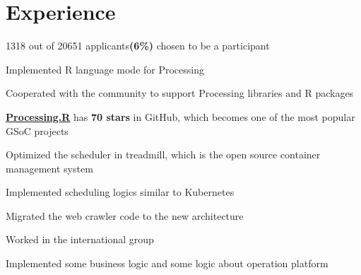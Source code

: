 \documentclass[]{deedy-resume-openfont}
\begin{document}
\begin{minipage}[t]{0.73\textwidth}


\section{Experience}
\sectionsep
{}
\vspace{\topsep}
\begin{tightemize}
    \item 1318 out of 20651 applicants\textbf{(6\%)} chosen to be a participant
    \item Implemented R language mode for Processing
    \item Cooperated with the community to support Processing libraries and R packages
    \item \href{https://github.com/gaocegege/Processing.R}{\bf Processing.R} has \textbf{70 stars} in GitHub, which becomes one of the most popular GSoC projects
\end{tightemize}
\sectionsep

\begin{tightemize}
\item Optimized the scheduler in treadmill, which is the open source container management system
\item Implemented scheduling logics similar to Kubernetes
\end{tightemize}
\sectionsep

\begin{tightemize}
\item Migrated the web crawler code to the new architecture
\end{tightemize}
\sectionsep

\begin{tightemize}
\item Worked in the international group
\item Implemented some business logic and some logic about operation platform
\end{tightemize}
\sectionsep


\end{minipage}
\end{document}
